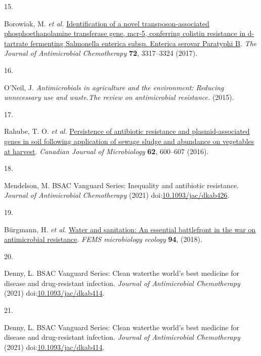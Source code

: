 \documentclass[
]{book}
\newlength{\cslhangindent}
\newlength{\csllabelwidth}
\newlength{\cslentryspacingunit} %
\newenvironment{CSLReferences}[2] %
 {%
  \setlength{\parindent}{0pt}
  \ifodd #1
  \let\oldpar\par
  \def\par{\hangindent=\cslhangindent\oldpar}
  \fi
  \setlength{\parskip}{#2\cslentryspacingunit}
 }%
 {}
\newcommand{\CSLLeftMargin}[1]{\parbox[t]{\csllabelwidth}{#1}}
\newcommand{\CSLRightInline}[1]{\parbox[t]{\linewidth - \csllabelwidth}{#1}\break}
\begin{document}
\begin{CSLReferences}{0}{0}
\leavevmode{}%
\CSLLeftMargin{15. }
\CSLRightInline{Borowiak, M. \emph{et al.} \href{https://doi.org/10.1093/jac/dkx327}{Identification of a novel transposon-associated phosphoethanolamine transferase gene, mcr-5, conferring colistin resistance in d-tartrate fermenting {Salmonella} enterica subsp. Enterica serovar {Paratyphi B}}. \emph{The Journal of Antimicrobial Chemotherapy} \textbf{72}, 3317--3324 (2017).}

\leavevmode{}%
\CSLLeftMargin{16. }
\CSLRightInline{O'Neil, J. \emph{Antimicrobials in agriculture and the environment: Reducing unnecessary use and waste.{The} review on antimicrobial resistance.} (2015).}

\leavevmode{}%
\CSLLeftMargin{17. }
\CSLRightInline{Rahube, T. O. \emph{et al.} \href{https://doi.org/10.1139/cjm-2016-0034}{Persistence of antibiotic resistance and plasmid-associated genes in soil following application of sewage sludge and abundance on vegetables at harvest}. \emph{Canadian Journal of Microbiology} \textbf{62}, 600--607 (2016).}

\leavevmode{}%
\CSLLeftMargin{18. }
\CSLRightInline{Mendelson, M. {BSAC Vanguard Series}: Inequality and antibiotic resistance. \emph{Journal of Antimicrobial Chemotherapy} (2021) doi:\href{https://doi.org/10.1093/jac/dkab426}{10.1093/jac/dkab426}.}

\leavevmode{}%
\CSLLeftMargin{19. }
\CSLRightInline{Bürgmann, H. \emph{et al.} \href{https://doi.org/10.1093/femsec/fiy101}{Water and sanitation: An essential battlefront in the war on antimicrobial resistance}. \emph{FEMS microbiology ecology} \textbf{94}, (2018).}

\leavevmode{}%
\CSLLeftMargin{20. }
\CSLRightInline{Denny, L. {BSAC Vanguard Series}: Clean water\textemdash the world's best medicine for disease and drug-resistant infection. \emph{Journal of Antimicrobial Chemotherapy} (2021) doi:\href{https://doi.org/10.1093/jac/dkab414}{10.1093/jac/dkab414}.}

\leavevmode{}%
\CSLLeftMargin{21. }
\CSLRightInline{Denny, L. {BSAC Vanguard Series}: Clean water\textemdash the world's best medicine for disease and drug-resistant infection. \emph{Journal of Antimicrobial Chemotherapy} (2021) doi:\href{https://doi.org/10.1093/jac/dkab414}{10.1093/jac/dkab414}.}


\end{CSLReferences}
\end{document}
